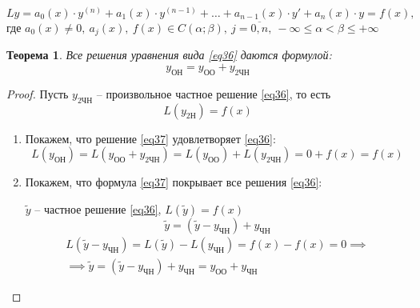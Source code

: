 \documentclass[11pt,a4paper,oneside]{report}
\theoremstyle{definition}
\theoremstyle{plain}
\newtheorem{theorem}{Теорема}[section]
\theoremstyle{remark}
\begin{document}
\begin{equation}\label{eq36}
    Ly = a_0(x) \cdot y^{(n)} + a_1(x) \cdot y^{(n-1)} + \ldots + a_{n-1}(x)\cdot y' + a_n(x) \cdot y = f(x),
\end{equation}
где $a_0(x)\ne0, \ a_j(x), \ f(x) \in C(\alpha;\beta), \ j = \overline{0,n}, \ -\infty \leqslant \alpha <\beta \leqslant +\infty$

\begin{theorem}
    Все решения уравнения вида \ref{eq36} даются формулой:
    \begin{equation}\label{eq37}
        y_{\text{ОН}} = y_{\text{ОО}} + y_{2\text{ЧН}}
    \end{equation}
\end{theorem}

\begin{proof}
    Пусть $y_{2\text{ЧН}}$ -- произвольное частное решение \ref{eq36}, то есть
    \begin{equation*}
        L(y_{2\text{Н}}) = f(x)
    \end{equation*}
    \begin{enumerate}
        \item Покажем, что решение \ref{eq37} удовлетворяет \ref{eq36}:
              \begin{equation*}
                  L(y_{\text{ОН}}) = L(y_{\text{ОО}} + y_{2\text{ЧН}}) = L(y_{\text{ОО}}) + L(y_{2\text{ЧН}}) = 0 + f(x) = f(x)
              \end{equation*}

        \item Покажем, что формула \ref{eq37} покрывает все решения \ref{eq36}:

              $\widetilde{y}$ -- частное решение \ref{eq36}, $L(\widetilde{y}) = f(x)$
              \begin{equation*}
                  \widetilde{y} = (\widetilde{y} - y_{\text{ЧН}}) + y_{\text{ЧН}}
              \end{equation*}
              \begin{multline*}
                  L(\widetilde{y} - y_{\text{ЧН}}) = L(\widetilde{y}) - L(y_{\text{ЧН}}) = f(x) - f(x) = 0 \implies \\
                  \implies \widetilde{y} = (\widetilde{y} - y_{\text{ЧН}}) + y_{\text{ЧН}} = y_{\text{ОО}} + y_{\text{ЧН}}
              \end{multline*}
    \end{enumerate}
\end{proof}
\end{document}
